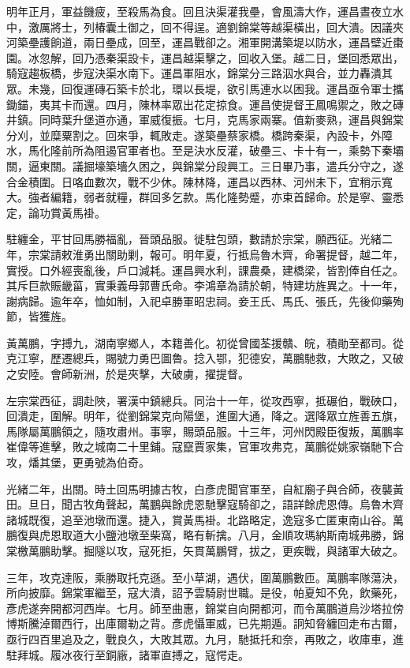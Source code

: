 \begin{pinyinscope}
明年正月，軍益饑疲，至殺馬為食。回且決渠灌我壘，會風濤大作，運昌晝夜立水中，激厲將士，列椿囊土御之，回不得逞。適劉錦棠等越渠橫出，回大潰。因議夾河築壘護餉道，兩日壘成，回至，運昌戰卻之。湘軍開溝築堤以防水，運昌壁近棗園。冰忽解，回乃憑秦渠設卡，運昌越渠擊之，回收入堡。越二日，堡回悉眾出，騎寇趨板橋，步寇決渠水南下。運昌軍阻水，錦棠分三路泅水與合，並力轟潰其眾。未幾，回復運磚石築卡於北，環以長堤，欲引馬連水以困我。運昌亟令軍士攜鋤錨，夷其卡而還。四月，陳林率眾出花定掠食。運昌使提督王鳳鳴禦之，敗之磚井鎮。同時葉升堡道亦通，軍威復振。七月，克馬家兩寨。值新麥熟，運昌與錦棠分刈，並糜粟割之。回來爭，輒敗走。遂築壘蔡家橋。橋跨秦渠，內設卡，外障水，馬化隆前所為阻遏官軍者也。至是決水反灌，破壘三、卡十有一，乘勢下秦壩關，逼東關。議掘壕築墻久困之，與錦棠分段興工。三日畢乃事，遣兵分守之，遂合金積圍。日咯血數次，戰不少休。陳林降，運昌以西林、河州未下，宜稍示寬大。強者編籍，弱者就糧，群回多乞款。馬化隆勢蹙，亦束首歸命。於是寧、靈悉定，論功賞黃馬褂。

駐纏金，平甘回馬勝福亂，晉頭品服。徙駐包頭，數請於宗棠，願西征。光緒二年，宗棠請敕淮勇出關助剿，報可。明年夏，行抵烏魯木齊，命署提督，越二年，實授。口外經喪亂後，戶口減耗。運昌興水利，課農桑，建橋梁，皆割俸自任之。其斥巨款賑畿菑，實秉義母郭曹氏命。李鴻章為請於朝，特建坊旌異之。十一年，謝病歸。逾年卒，恤如制，入祀卓勝軍昭忠祠。妾王氏、馬氏、張氏，先後仰藥殉節，皆獲旌。

黃萬鵬，字搏九，湖南寧鄉人，本籍善化。初從曾國荃援贛、皖，積勛至都司。從克江寧，歷遷總兵，賜號力勇巴圖魯。捻入鄂，犯德安，萬鵬馳救，大敗之，又破之安陸。會師新洲，於是夾擊，大破虜，擢提督。

左宗棠西征，調赴陜，署漢中鎮總兵。同治十一年，從攻西寧，抵碾伯，戰硤口，回潰走，圍解。明年，從劉錦棠克向陽堡，進圍大通，降之。選降眾立旌善五旗，馬隊屬萬鵬領之，隨攻肅州。事寧，賜頭品服。十三年，河州閃殿臣復叛，萬鵬率崔偉等進擊，敗之城南二十里鋪。寇竄賈家集，官軍攻弗克，萬鵬從姚家嶺馳下合攻，燔其堡，更勇號為伯奇。

光緒二年，出關。時土回馬明據古牧，白彥虎聞官軍至，自紅廟子與合師，夜襲黃田。旦日，聞古牧角聲起，萬鵬與餘虎恩馳擊寇騎卻之，語詳餘虎恩傳。烏魯木齊諸城既復，追至池墩而還。捷入，賞黃馬褂。北路略定，逸寇多亡匿東南山谷。萬鵬復與虎恩取道大小鹽池墩至柴窩，略有斬擒。八月，金順攻瑪納斯南城弗勝，錦棠檄萬鵬助擊。掘隧以攻，寇死拒，矢貫萬鵬臂，拔之，更疾戰，與諸軍大破之。

三年，攻克達阪，乘勝取托克遜。至小草湖，遇伏，圍萬鵬數匝。萬鵬率隊蕩決，所向披靡。錦棠軍繼至，寇大潰，詔予雲騎尉世職。是役，帕夏知不免，飲藥死，彥虎遂奔開都河西岸。七月。師至曲惠，錦棠自向開都河，而令萬鵬道烏沙塔拉傍博斯騰淖爾西行，出庫爾勒之背。彥虎懾軍威，已先期遁。詗知脅纏回走布古爾，亟行四百里追及之，戰良久，大敗其眾。九月，馳抵托和奈，再敗之，收庫車，進駐拜城。履冰夜行至銅廠，諸軍直搏之，寇愕走。


\end{pinyinscope}
